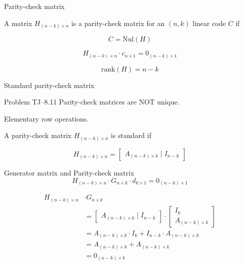 \begin{frame}{Parity-check matrix}
  \begin{definition}
	A matrix $H_{(n - k) \times n}$ is a parity-check matrix for an $(n,k)$ linear code $C$ if

	\[
	  C = \text{Nul}(H)
	\]
  \end{definition}

  \[
	H_{(n - k) \times n} \cdot c_{n \times 1} = 0_{(n - k) \times 1}
  \]

  \[
	\text{rank}(H) = n - k
  \]
\end{frame}
\begin{frame}{Standard parity-check matrix}
  \begin{exampleblock}{Problem TJ--8.11}
	Parity-check matrices are NOT unique.
  \end{exampleblock}

  \centerline{Elementary row operations.}

  \vspace{0.60cm}
  \begin{definition}
	A parity-check matrix $H_{(n-k) \times n}$ is standard if

	\[
	  H_{(n-k) \times n} = \begin{bmatrix}
		A_{(n-k) \times k} \mid I_{n-k}
	  \end{bmatrix}
	\]
  \end{definition}
\end{frame}
\begin{frame}{Generator matrix and Parity-check matrix}
  \[
	H_{(n-k) \times n} \cdot G_{n \times k} \cdot d_{k \times 1} = 0_{(n-k) \times 1}
  \]

  \begin{align*}
	H_{(n-k) \times n} &\cdot G_{n \times k} \\
	&= \begin{bmatrix}
	  A_{(n-k) \times k} \mid I_{n-k} 
	\end{bmatrix}
	\cdot
	\begin{bmatrix}
	  I_k \\ A_{(n-k) \times k}
	\end{bmatrix} \\
	&= A_{(n-k) \times k} \cdot I_k + I_{n-k} \cdot A_{(n-k) \times k} \\
	&= A_{(n-k) \times k} + A_{(n-k) \times k} \\
	&= 0_{(n-k) \times k}
  \end{align*}
\end{frame}
